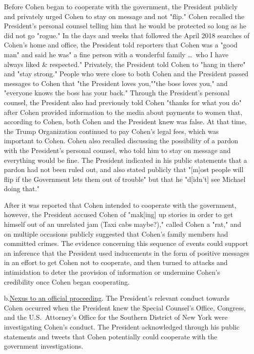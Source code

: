 Before Cohen began to cooperate with the government, the President publicly and privately urged Cohen to stay on message and not "flip." Cohen recalled the President's personal counsel telling him that he would be protected so long as he did not go "rogue."
In the days and weeks that followed the April 2018 searches of Cohen's home and office, the President told reporters that Cohen was a "good man" and said he was" a fine person with a wonderful family \dots\ who I have always liked \& respected."
Privately, the President told Cohen to "hang in there" and "stay strong." People who were close to both Cohen and the President passed messages to Cohen that "the President loves you,""the boss loves you," and "everyone knows the boss has your back."
Through the President's personal counsel, the President also had previously told Cohen "thanks for what you do" after Cohen provided information to the media about payments to women that, according to Cohen, both Cohen and the President knew was false.
At that time, the Trump Organization continued to pay Cohen's legal fees, which was important to Cohen.
Cohen also recalled discussing the possibility of a pardon with the President's personal counsel, who told him to stay on message and everything would be fine.
The President indicated in his public statements that a pardon had not been ruled out, and also stated publicly that "[m]ost people will flip if the Government lets them out of trouble" but that he "d[idn't] see Michael doing that."

After it was reported that Cohen intended to cooperate with the government, however, the President accused Cohen of "mak[ing] up stories in order to get himself out of an unrelated jam (Taxi cabs maybe?)," called Cohen a "rat," and on multiple occasions publicly suggested that Cohen's family members had committed crimes.
The evidence concerning this sequence of events could support an inference that the President used inducements in the form of positive messages in an effort to get Cohen not to cooperate, and then turned to attacks and intimidation to deter the provision of information or undermine Cohen's credibility once Cohen began cooperating.

b.\qquad\underline{Nexus to an official proceeding}.
The President's relevant conduct towards Cohen occurred when the President knew the Special Counsel's Office, Congress, and the U.S.~Attorney's Office for the Southern District of New York were investigating Cohen's conduct.
The President acknowledged through his public statements and tweets that Cohen potentially could cooperate with the government investigations.

